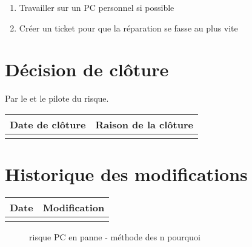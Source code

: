 \begin{enumerate}
	\item Travailler sur un PC personnel si possible
	\item Créer un ticket pour que la réparation se fasse au plus vite
\end{enumerate}

\section*{Décision de clôture}
Par le \CP{} et le pilote du risque.
\begin{table}[H]
\centering
	\begin{tabularx}{16.8cm}{|X|X|}
	\hline
	\rowcolor{gray!40} Date de clôture & Raison de la clôture \\
	\hline
	  & \\
	\hline
	\end{tabularx}
\end{table}

\section*{Historique des modifications}
\begin{table}[H]
\centering
	\begin{tabularx}{16.8cm}{|X|X|}
	\hline
	\rowcolor{gray!40} Date & Modification \\
	\hline
	  & \\
	\hline
	\end{tabularx}
\end{table}
\newpage


\begin{figure}
	\centering
	\caption{\label{PC en panne}risque PC en panne - méthode des n pourquoi}
\end{figure}